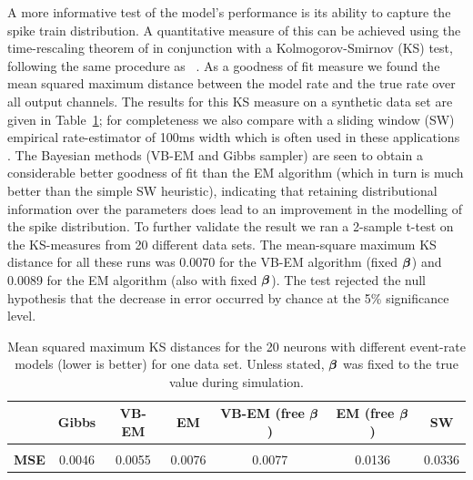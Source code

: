 \documentclass[12pt]{article}
\begin{document}
A more informative test of the model's performance is its ability to capture the spike train
distribution. A quantitative measure of this can be achieved using the time-rescaling theorem of
\cite{Brown_2002} in conjunction with a Kolmogorov-Smirnov (KS) test, following the same procedure
as ~\cite{Smith_2003,Barbieri_2005}.  As a goodness of fit measure we found the mean squared maximum
distance between the model rate and the true rate over all output channels. The results for this KS
measure on a synthetic data set are given in Table~\ref{tab:MSE}; for completeness we also compare
with a sliding window (SW) empirical rate-estimator of 100ms width which is often used in these
applications \cite{Riehle_1997}. The Bayesian methods (VB-EM and Gibbs sampler) are seen to obtain a
considerable better goodness of fit than the EM algorithm (which in turn is much better than the
simple SW heuristic), indicating that retaining distributional information over the parameters does
lead to an improvement in the modelling of the spike distribution. To further validate the result we
ran a 2-sample t-test on the KS-measures from 20 different data sets. The mean-square maximum KS
distance for all these runs was 0.0070 for the VB-EM algorithm (fixed ${\bm \beta}$) and 0.0089 for the
EM algorithm (also with fixed ${\bm \beta}$). The test rejected the null hypothesis that the decrease in
error occurred by chance at the 5\% significance level.

\begin{table}[h] \caption{Mean squared maximum KS distances for the 20 neurons with different
	event-rate models (lower is better) for one data set. Unless stated, ${\bm \beta}$ was fixed to
	the true value during simulation.} \label{tab:MSE} \begin{center}
		\begin{tabular}{c|c|c|c|c|c|c} &{\bf Gibbs} &{\bf VB-EM} &{\bf EM}  & {\bf VB-EM}
			(free ${\bm \beta}$)  & {\bf EM} (free ${\bm \beta}$) &{\bf SW} \\ \hline &&&
			\\[-2ex] {\bf MSE}  & 0.0046 & 0.0055 & 0.0076  & 0.0077  &  0.0136 & 0.0336
			\\ \end{tabular} \end{center} \end{table}
\end{document}
